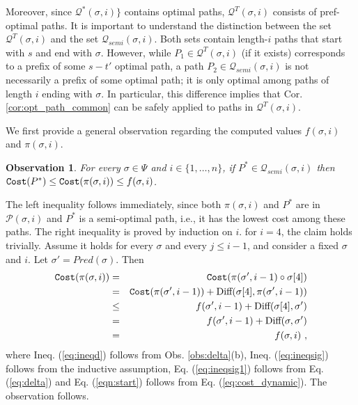 \documentclass[12pt]{article}
\newtheorem{observation}[theorem]{Observation}
\def\Cost{\mbox{\tt Cost}}
\def\Proof{\par\noindent{\bf Proof:~}}
\newcommand{\DIFF}[0]{\mbox{Diff}}
\newcommand{\DegThreeConst}[0]{4}
\def\Cost{\mbox{\tt Cost}}
\begin{document}
Moreover, since $\mathcal{Q}^{*}(\sigma,i)\}$ contains optimal paths, $\mathcal{Q}^{T}(\sigma,i)$ consists of pref-optimal paths.
It is important to understand the distinction between the set $\mathcal{Q}^{T}(\sigma,i)$ and the set $\mathcal{Q}_{semi}(\sigma,i)$. Both sets contain length-$i$ paths that start with $s$ and end with $\sigma$. However, while $P_1 \in \mathcal{Q}^{T}(\sigma,i)$ (if it exists) corresponds to a prefix of some $s-t'$ optimal path, a path $P_2 \in \mathcal{Q}_{semi}(\sigma,i)$ is not necessarily a prefix of some optimal path; it is only optimal among paths of length $i$ ending with $\sigma$. In particular, this difference implies that Cor. \ref{cor:opt_path_common} can be safely applied to paths in $\mathcal{Q}^{T}(\sigma,i)$. \\
\par We first provide a general observation regarding the computed values $f(\sigma,i)$ and $\pi(\sigma,i)$.
\begin{observation}
\label{lem:start}
For every $\sigma \in \Psi$ and $i \in \{1, \ldots, n\}$, if $P^{*} \in \mathcal{Q}_{semi}(\sigma,i)$ then $\Cost(P^{*})\leq \Cost(\pi(\sigma,i)) \leq f(\sigma,i)$.
\end{observation}
\Proof
The left inequality follows immediately, since both $\pi(\sigma,i)$ and $P^{*}$ are in $\mathcal{P}(\sigma,i)$ and $P^{*}$ is a semi-optimal path, i.e., it has the lowest cost among these paths. The right inequality is proved by induction on $i$. for $i=\DegThreeConst$, the claim holds trivially. Assume it holds for every $\sigma$ and every $j \leq i-1$, and consider a fixed $\sigma$ and $i$. Let $\sigma'=Pred(\sigma)$. Then
\begin{eqnarray}
\label{eqn:start}
\Cost(\pi(\sigma,i))&=&\Cost(\pi(\sigma',i-1) \circ \sigma[\DegThreeConst]) \nonumber
\\&=&
\Cost(\pi(\sigma',i-1))+\DIFF(\sigma[\DegThreeConst],\pi(\sigma',i-1)) \label{eq:ineqd}
\\&\leq&
f(\sigma',i-1)+\DIFF(\sigma[\DegThreeConst],\sigma')
\label{eq:ineqsig}
\\&=&
f(\sigma',i-1)+\DIFF(\sigma,\sigma')  \label{eq:ineqsig1}
\\&=&
f(\sigma,i) ~, \label{eq:ineqsig2}
\end{eqnarray}
where Ineq. (\ref{eq:ineqd}) follows from Obs. \ref{obs:delta}(b), Ineq. (\ref{eq:ineqsig}) follows from the inductive assumption, Eq. (\ref{eq:ineqsig1}) follows from Eq. (\ref{eq:delta}) and Eq. (\ref{eqn:start}) follows from Eq. (\ref{eq:cost_dynamic}). The observation follows.
\end{document}
